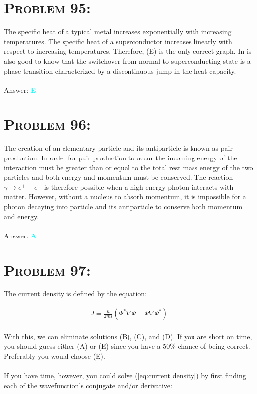 \documentclass{article}
\begin{document}

\section{\textsc{Problem 95:}} The specific heat of a typical metal increases exponentially with increasing temperatures. The specific heat of a superconductor increases linearly with respect to increasing temperatures. Therefore, (E) is the only correct graph. In is also good to know that the switchover from normal to superconducting state is a phase transition  characterized by a discontinuous jump in the heat capacity.
\\\\
Answer: \textbf{\textcolor{cyan}E}\\


\section{\textsc{Problem 96:}} 
The creation of an elementary particle and its antiparticle is known as pair production.  In order for pair production to occur the incoming energy of the interaction must be greater than or equal to the total rest mass energy of the two particles and both energy and momentum must be conserved. The reaction $\gamma \rightarrow e^{+} + e^{-}$ is therefore possible when a high energy photon interacts with matter. However, without a nucleus to absorb momentum, it is impossible for a photon decaying into particle and its antiparticle to conserve both momentum and energy.
\\\\
Answer: \textbf{\textcolor{cyan}A}\\


\section{\textsc{Problem 97:}} The current density is defined by the equation:

\begin{gather}
\label {eq:current density} J = \frac{\hbar}{2m i} \left( \Psi^{*} \nabla \Psi -  \Psi \nabla \Psi^{*} \right)
\end{gather}
\\
With this, we can eliminate solutions (B), (C), and (D). If you are short on time, you should guess either (A) or (E) since you have a 50\% chance of being correct. Preferably you would choose (E). \\
\\
If you have time, however, you could solve (\ref {eq:current density}) by first finding each of the wavefunction's conjugate and/or derivative:
\end{document}
